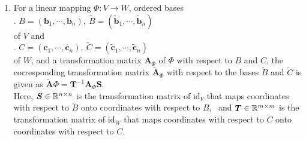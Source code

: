 \begin{enumerate}
    \item
    \begin{theorem}
        For a linear mapping $\Phi : V \to W$, ordered bases
        \hfill \cite{mfml/book/mml/Deisenroth-Faisal-Ong}
        \\
        .\hfill
        $
            B = (\bm{b}_1, \cdots , \bm{b}_n), \
            \tilde{B} = (\tilde{\bm{b}}_1, \cdots , \tilde{\bm{b}}_n)
        $
        \hfill \cite{mfml/book/mml/Deisenroth-Faisal-Ong}
        \\
        of $V$ and
        \hfill \cite{mfml/book/mml/Deisenroth-Faisal-Ong}
        \\
        .\hfill
        $
            C = (\bm{c}_1, \cdots , \bm{c}_n), \
            \tilde{C} = (\tilde{\bm{c}}_1, \cdots , \tilde{\bm{c}}_n)
        $
        \hfill \cite{mfml/book/mml/Deisenroth-Faisal-Ong}
        \\
        of $W$, and a transformation matrix $\bm{A}_\Phi$ of $\Phi$ with respect to $B$ and $C$, the corresponding transformation matrix $\tilde{\bm{A}} _\Phi$ with respect to the bases $\tilde{B}$ and $\tilde{C}$ is given as
        $
            \tilde{\bm{A}} \Phi = \bm{T}^{-1}\bm{A}_\Phi \bm{S}
        $.
        \hfill \cite{mfml/book/mml/Deisenroth-Faisal-Ong}
        \\
        Here, $\bm{S} \in \mathbb{R}^{n\times n}$ is the transformation matrix of $\text{id}_V$ that maps coordinates with respect to $\tilde{B}$ onto coordinates with respect to $B$, \
        and $\bm{T} \in \mathbb{R}^{m\times m}$ is the transformation matrix of $\text{id}_W$ that maps coordinates with respect to $\tilde{C}$ onto coordinates with respect to $C$.
        \hfill \cite{mfml/book/mml/Deisenroth-Faisal-Ong}
    \end{theorem}


\end{enumerate}
